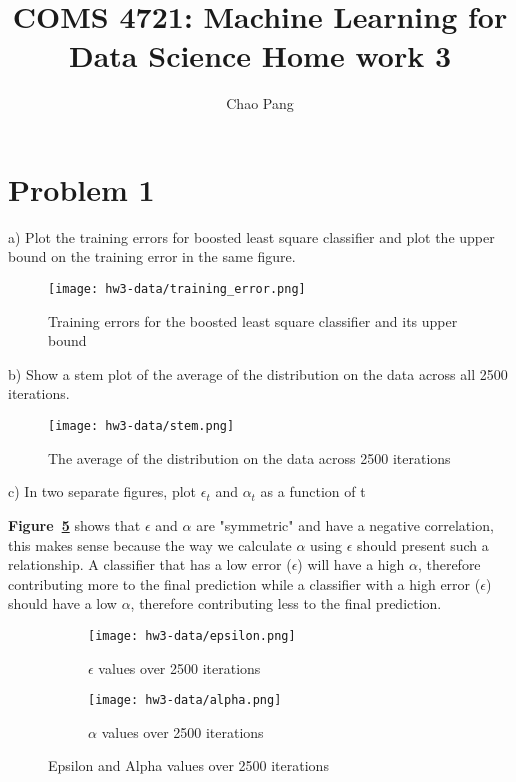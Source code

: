 \documentclass[11pt]{report}
\begin{document}
\title{COMS 4721: Machine Learning for Data Science 
Home work 3}
\author{Chao Pang}
 
\maketitle

\section* {Problem 1}
a) Plot the training errors for boosted least square classifier and plot the upper bound on the training error in the same figure. 

\begin{figure}[h]
\texttt{[image: hw3-data/training\_error.png]}
\centering
\caption{Training errors for the boosted least square classifier and its upper bound}
\label{fig:training_error}
\end{figure}

\pagebreak

\justify b) Show a stem plot of the average of the distribution on the data across all 2500 iterations.

\begin{figure}[h]
\texttt{[image: hw3-data/stem.png]}
\centering
\caption{The average of the distribution on the data across 2500 iterations}
\label{fig:training_error}
\end{figure}

\pagebreak

\justify c) In two separate figures, plot $\epsilon_{t}$ and $\alpha_{t}$ as a function of t

\justify \textbf{Figure~\ref{fig:epsilon_alpha}} shows that $\epsilon$ and $\alpha$ are "symmetric" and have a negative correlation, this makes sense because the way we calculate $\alpha$ using $\epsilon$ should present such a relationship. A classifier that has a low error ($\epsilon$) will have a high $\alpha$, therefore contributing more to the final prediction while a classifier with a high error ($\epsilon$) should have a low $\alpha$, therefore contributing less to the final prediction. 

\begin{figure}[!htb]
    \begin{subfigure}[b]{0.5\textwidth}
      \texttt{[image: hw3-data/epsilon.png]}
      \caption{$\epsilon$ values over 2500 iterations}
      \label{subfig-1:epsilon}
    \end{subfigure}
    \hfill
    \begin{subfigure}[b]{0.5\textwidth}
      \texttt{[image: hw3-data/alpha.png]}
      \caption{$\alpha$ values over 2500 iterations}
      \label{subfig-2:alpha}
    \end{subfigure}
    \caption{Epsilon and Alpha values over 2500 iterations}
    \label{fig:epsilon_alpha}
\end{figure}
\pagebreak
\end{document}
